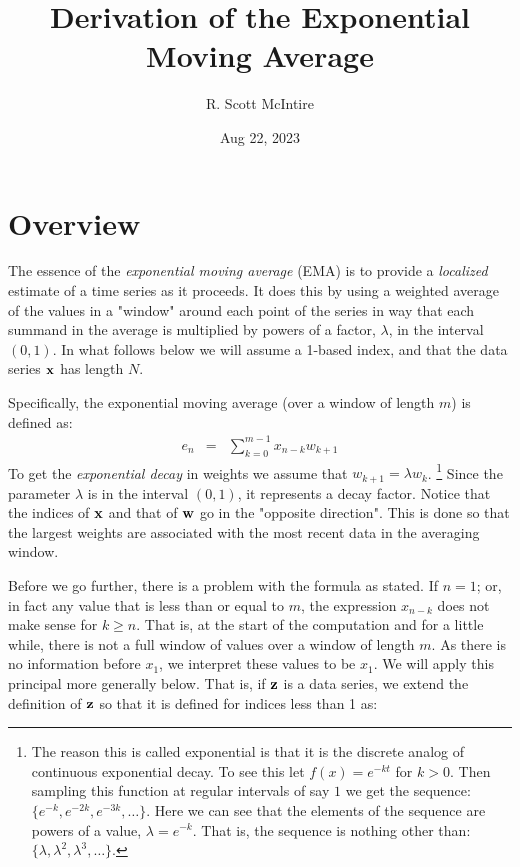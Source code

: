 \documentclass{article}
\title{Derivation of the Exponential Moving Average}
\author{R. Scott McIntire}
\date{Aug 22, 2023}
\begin{document}
\maketitle


\section{Overview}

The essence of the {\em exponential moving average\/} (EMA) is to provide 
a {\em localized\/} estimate of a time series as it proceeds. It does 
this by using a weighted average of the values in a "window" around each point 
of the series in way that each summand in 
the average is multiplied by powers of a factor, $\lambda$,
in the interval $(0,1)$.
In what follows below we will assume a 1-based index, and that 
the data series ${\bf x}$ has length $N$.

Specifically, the exponential moving average (over a window of length $m$) 
is defined as:
\begin{eqnarray}
    e_n & = & \sum_{k=0}^{m-1} x_{n-k} w_{k+1} \label{ema_def}
\end{eqnarray}
To get the {\em exponential decay\/} in weights we assume that $w_{k+1} = \lambda w_k$.%
\footnote{The reason this is called exponential is that it is the discrete
analog of continuous exponential decay. To see this let $f(x) = e^{-kt}$ 
for $k > 0$. Then sampling this function at regular intervals of say $1$ 
we get the sequence: $\{ e^{-k}, e^{-2k}, e^{-3k}, \ldots \}$.
Here we can see that the elements of the sequence are powers of a value, $\lambda = e^{-k}$.
That is, the sequence is nothing other than: $\{\lambda, \lambda^2, \lambda^3, \ldots \}$.}
Since the parameter $\lambda$ is in the interval $(0,1)$, it represents a decay factor. 
Notice that the indices of ${\bf x}$ and that of ${\bf w}$ go in the "opposite direction".
This is done so that the largest weights are associated with the most recent data
in the averaging window.

Before we go further, there is a problem with the formula as stated.
If $n = 1$; or, in fact any value that is less than or equal to $m$,
the expression $x_{n-k}$ does not make sense for $k \ge n$. That is, at the 
start of the computation and for a little while, there is not a full window
of values over a window of length $m$. As there is no information before $x_1$,
we interpret these values to be $x_1$. 
We will apply this principal more generally below. 
That is, if ${\bf z}$ is a data series,
we extend the definition of ${\bf z}$ so that it is defined for
indices less than 1 as:
\end{document}
